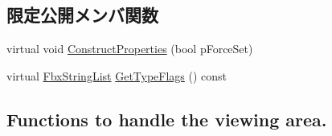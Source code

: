 \subsection*{限定公開メンバ関数}
\begin{DoxyCompactItemize}
\item 
virtual void \hyperlink{class_fbx_camera_a11334e5358efacbd87e4a7d78036155d}{Construct\+Properties} (bool p\+Force\+Set)
\item 
virtual \hyperlink{class_fbx_string_list}{Fbx\+String\+List} \hyperlink{class_fbx_camera_ac52d0e82cbabac69f8b0dcd212853616}{Get\+Type\+Flags} () const
\end{DoxyCompactItemize}
\subsection*{Functions to handle the viewing area.}
